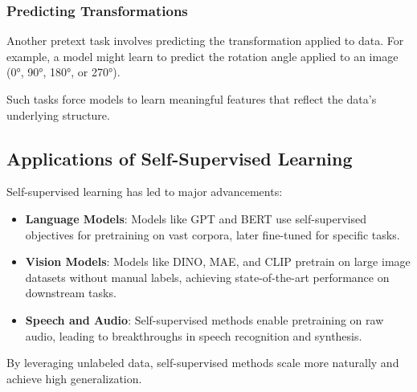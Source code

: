 \documentclass[openany]{book}
\begin{document}
\subsubsection{Predicting Transformations}
Another pretext task involves predicting the transformation applied to data. For 
example, a model might learn to predict the rotation angle applied to an image 
(0°, 90°, 180°, or 270°).

Such tasks force models to learn meaningful features that reflect the data's 
underlying structure.

\subsection{Applications of Self-Supervised Learning}
Self-supervised learning has led to major advancements:
\begin{itemize}
    \item \textbf{Language Models}: Models like GPT and BERT use self-supervised 
    objectives for pretraining on vast corpora, later fine-tuned for specific 
    tasks.
    \item \textbf{Vision Models}: Models like DINO, MAE, and CLIP pretrain on 
    large image datasets without manual labels, achieving state-of-the-art 
    performance on downstream tasks.
    \item \textbf{Speech and Audio}: Self-supervised methods enable pretraining
     on raw audio, leading to breakthroughs in speech recognition and synthesis.
\end{itemize}

By leveraging unlabeled data, self-supervised methods scale more naturally and 
achieve high generalization.
\end{document}
